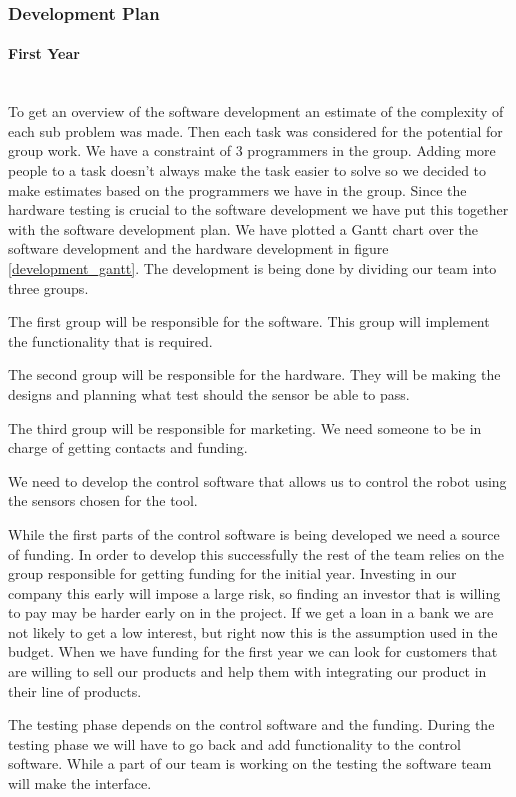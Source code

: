 \subsubsection{Development Plan}
\paragraph*{First Year}~\\
To get an overview of the software development an estimate of the complexity of each sub problem was made.
Then each task was considered for the potential for group work.
We have a constraint of 3 programmers in the group.
Adding more people to a task doesn't always make the task easier to solve so we decided to make estimates based on the programmers we have in the group.
Since the hardware testing is crucial to the software development we have put this together with the software development plan. 
We have plotted a Gantt chart over the software development and the hardware development in figure \ref{development_gantt}.
The development is being done by dividing our team into three groups. 

The first group will be responsible for the software. 
This group will implement the functionality that is required.

The second group will be responsible for the hardware. 
They will be making the designs and planning what test should the sensor be able to pass.

The third group will be responsible for marketing. 
We need someone to be in charge of getting contacts and funding. 

We need to develop the control software that allows us to control the robot using the sensors chosen for the tool. 

While the first parts of the control software is being developed we need a source of funding.
In order to develop this successfully the rest of the team relies on the group responsible for getting funding for the initial year.
Investing in our company this early will impose a large risk, so finding an investor that is willing to pay may be harder early on in the project. 
If we get a loan in a bank we are not likely to get a low interest, but right now this is the assumption used in the budget.
When we have funding for the first year we can look for customers that are willing to sell our products and help them with integrating our product in their line of products.

The testing phase depends on the control software and the funding. 
During the testing phase we will have to go back and add functionality to the control software. 
While a part of our team is working on the testing the software team will make the interface.


